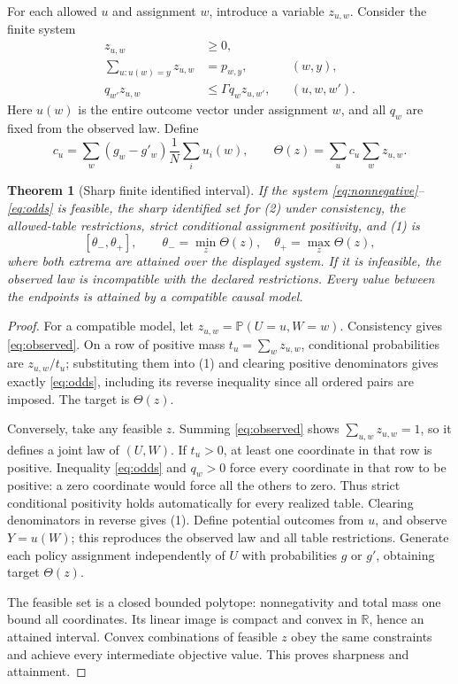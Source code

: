 \documentclass[11pt,a4paper]{article}
\newtheorem{theorem}{Theorem}[section]
\theoremstyle{definition}
\theoremstyle{remark}
\newcommand{\R}{\mathbb R}
\newcommand{\Prb}{\mathbb P}
\begin{document}
For each allowed $u$ and assignment $w$, introduce a variable $z_{u,w}$. Consider the finite system
\begin{align}
 z_{u,w}&\ge0, \label{eq:nonnegative}\\
 \sum_{u:u(w)=y}z_{u,w}&=p_{w,y}, &&(w,y),\label{eq:observed}\\
 q_{w'}z_{u,w}&\le\Gamma q_wz_{u,w'}, &&(u,w,w').\label{eq:odds}
\end{align}
Here $u(w)$ is the entire outcome vector under assignment $w$, and all $q_w$ are fixed from the observed law. Define
\[
 c_u=\sum_w(g_w-g'_w)\frac1N\sum_iu_i(w),\qquad
 \Theta(z)=\sum_uc_u\sum_wz_{u,w}.
\]

\begin{theorem}[Sharp finite identified interval]
If the system \eqref{eq:nonnegative}--\eqref{eq:odds} is feasible, the sharp identified set for (2) under consistency, the allowed-table restrictions, strict conditional assignment positivity, and (1) is
\[
 [\theta_-,\theta_+],\qquad
 \theta_- =\min_z\Theta(z),\quad
 \theta_+ =\max_z\Theta(z),
 \tag{3}
\]
where both extrema are attained over the displayed system. If it is infeasible, the observed law is incompatible with the declared restrictions. Every value between the endpoints is attained by a compatible causal model.
\end{theorem}
\begin{proof}
For a compatible model, let $z_{u,w}=\Prb(U=u,W=w)$. Consistency gives \eqref{eq:observed}. On a row of positive mass $t_u=\sum_wz_{u,w}$, conditional probabilities are $z_{u,w}/t_u$; substituting them into (1) and clearing positive denominators gives exactly \eqref{eq:odds}, including its reverse inequality since all ordered pairs are imposed. The target is $\Theta(z)$.

Conversely, take any feasible $z$. Summing \eqref{eq:observed} shows $\sum_{u,w}z_{u,w}=1$, so it defines a joint law of $(U,W)$. If $t_u>0$, at least one coordinate in that row is positive. Inequality \eqref{eq:odds} and $q_w>0$ force every coordinate in that row to be positive: a zero coordinate would force all the others to zero. Thus strict conditional positivity holds automatically for every realized table. Clearing denominators in reverse gives (1). Define potential outcomes from $u$, and observe $Y=u(W)$; this reproduces the observed law and all table restrictions. Generate each policy assignment independently of $U$ with probabilities $g$ or $g'$, obtaining target $\Theta(z)$.

The feasible set is a closed bounded polytope: nonnegativity and total mass one bound all coordinates. Its linear image is compact and convex in $\R$, hence an attained interval. Convex combinations of feasible $z$ obey the same constraints and achieve every intermediate objective value. This proves sharpness and attainment.
\end{proof}
\end{document}
